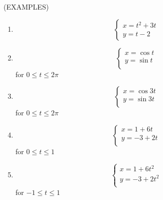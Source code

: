 \documentclass[11pt]{article}
\begin{document}
(EXAMPLES)
\begin{enumerate}
\item{
  \begin{displaymath}
  \left\{ \begin{array}{ll}
    x = t^2+3t \\
    y = t-2
\end{array} \right.
\end{displaymath}
}

\pagebreak

\item{
  \begin{displaymath}
  \left\{ \begin{array}{ll}
    x = \cos{t} \\
    y = \sin{t} \\
\end{array} \right.
  \end{displaymath}
   \vspace{0.1in}
  for $0\leq t \leq 2\pi$
}

  \vspace{3in}
  
  \item{
  \begin{displaymath}
  \left\{ \begin{array}{ll}
    x = \cos{3t} \\
    y = \sin{3t} \\
\end{array} \right.
  \end{displaymath}
     \vspace{0.1in}
  for $0\leq t \leq 2\pi$
}

\pagebreak

  \item{
  \begin{displaymath}
  \left\{ \begin{array}{ll}
    x = 1 + 6t \\
    y = -3 + 2t \\
\end{array} \right.
  \end{displaymath}
     \vspace{0.1in}
  for $0\leq t \leq 1$
}

    \vspace{3in}
    
      \item{
  \begin{displaymath}
  \left\{ \begin{array}{ll}
    x = 1 + 6t^2 \\
    y = -3 + 2t^2 \\
\end{array} \right.
  \end{displaymath}
     \vspace{0.1in}
  for $-1 \leq t \leq 1$
}


\end{enumerate}
\end{document}
